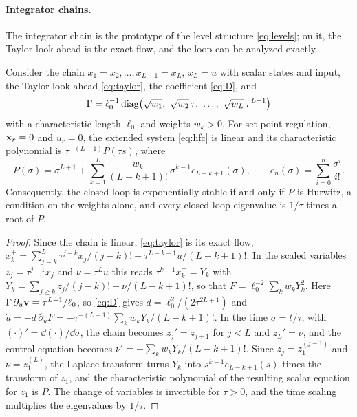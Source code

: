 
\paragraph{Integrator chains.}
The integrator chain is the prototype of the level structure \eqref{eq:levels}; on it, the Taylor
look-ahead is the exact flow, and the \method{} loop can be analyzed exactly.

\begin{proposition}\label{prop:chain}
Consider the chain $\dot x_1 = x_2,\dots,\dot x_{L-1} = x_L$, $\dot x_L = u$ with scalar states and
input, the Taylor look-ahead \eqref{eq:taylor}, the coefficient \eqref{eq:D}, and
\[
    \Gamma = \ell_0^{-1}\diag\bigl(\sqrt{w_1},\ \sqrt{w_2}\,\tau,\ \dots,\ \sqrt{w_L}\,\tau^{L-1}\bigr)
\]
with a characteristic length $\ell_0$ and weights $w_k > 0$.
For set-point regulation, $\mathbf{x}_r = 0$ and $u_r = 0$, the extended system \eqref{eq:hfc} is linear
and its characteristic polynomial is $\tau^{-(L+1)}P(\tau s)$, where
\begin{equation}\label{eq:chain-poly}
    P(\sigma) = \sigma^{L+1} + \sum_{k=1}^{L}\frac{w_k}{(L - k + 1)!}\,\sigma^{k-1}e_{L-k+1}(\sigma),
    \qquad e_n(\sigma) = \sum_{i=0}^{n}\frac{\sigma^i}{i!} .
\end{equation}
Consequently, the closed loop is exponentially stable if and only if $P$ is Hurwitz, a condition on
the weights alone, and every closed-loop eigenvalue is $1/\tau$ times a root of $P$.
\end{proposition}

\begin{proof}
Since the chain is linear, \eqref{eq:taylor} is its exact flow,
$x_k^+ = \sum_{j=k}^{L}\tau^{j-k}x_j/(j-k)! + \tau^{L-k+1}u/(L-k+1)!$.
In the scaled variables $z_j = \tau^{j-1}x_j$ and $\nu = \tau^L u$ this reads $\tau^{k-1}x_k^+ = Y_k$
with $Y_k = \sum_{j\ge k} z_j/(j-k)! + \nu/(L-k+1)!$, so that $F = \ell_0^{-2}\sum_{k} w_k Y_k^2$.
Here $\bar\Gamma\,\partial_u\mathbf{v} = \tau^{L-1}/\ell_0$, so \eqref{eq:D} gives
$d = \ell_0^2/(2\tau^{2L+1})$ and
$\dot u = -d\,\partial_u F = -\tau^{-(L+1)}\sum_k w_k Y_k/(L-k+1)!$.
In the time $\sigma = t/\tau$, with $(\cdot)' = \dd(\cdot)/\dd\sigma$, the chain becomes
$z_j' = z_{j+1}$ for $j < L$ and $z_L' = \nu$, and the control equation becomes
$\nu' = -\sum_k w_k Y_k/(L-k+1)!$.
Since $z_j = z_1^{(j-1)}$ and $\nu = z_1^{(L)}$, the Laplace transform turns $Y_k$ into
$s^{k-1}e_{L-k+1}(s)$ times the transform of $z_1$, and the characteristic polynomial of the
resulting scalar equation for $z_1$ is $P$.
The change of variables is invertible for $\tau > 0$, and the time scaling multiplies the
eigenvalues by $1/\tau$.
\end{proof}

